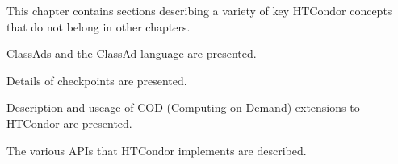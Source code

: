 This chapter contains sections describing a variety of key
HTCondor concepts that do not belong in other chapters.

ClassAds and the ClassAd language are presented.

Details of checkpoints are presented.

Description and useage of COD (Computing on Demand) extensions to HTCondor
are presented.

The various APIs that HTCondor implements are described.







